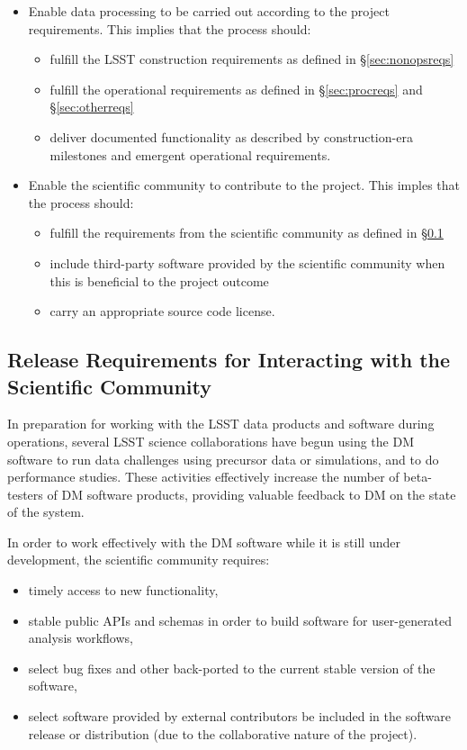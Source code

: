 \begin{itemize}
\item Enable data processing to be carried out according to the project requirements. This implies that the process should:
  \begin{itemize}
  \item fulfill the LSST construction requirements as defined in \S\ref{sec:nonopsreqs}
  \item fulfill the operational requirements as defined in \S\ref{sec:procreqs} and \S\ref{sec:otherreqs}
  \item deliver documented functionality as described by construction-era milestones and emergent operational requirements.
  \end{itemize}
\item Enable the scientific community to contribute to the project. This imples that the process should:
  \begin{itemize}
  \item fulfill the requirements from the scientific community as defined in \S\ref{sec:comreqs}
  \item include third-party software provided by the scientific community when this is beneficial to the project outcome
  \item carry an appropriate source code license.
  \end{itemize}
\end{itemize}


\subsection{Release Requirements for Interacting with the Scientific Community} \label{sec:comreqs}

In preparation for working with the \gls{LSST} data products and software during operations, several \gls{LSST} science collaborations have begun using the \gls{DM} software to run data challenges using precursor data or simulations, and to do performance studies.
These activities effectively increase the number of beta-testers of \gls{DM} software products, providing valuable feedback to \gls{DM} on the state of the system.

In order to work effectively with the \gls{DM} software while it is still under development, the scientific community requires:
\begin{itemize}
\item timely access to new functionality,
\item stable public APIs and schemas in order to build software for user-generated analysis workflows,
\item select bug fixes and other back-ported to the current stable version of the software,
\item select software provided by external contributors be included in the software release or distribution (due to the collaborative nature of the project).
\end{itemize}


